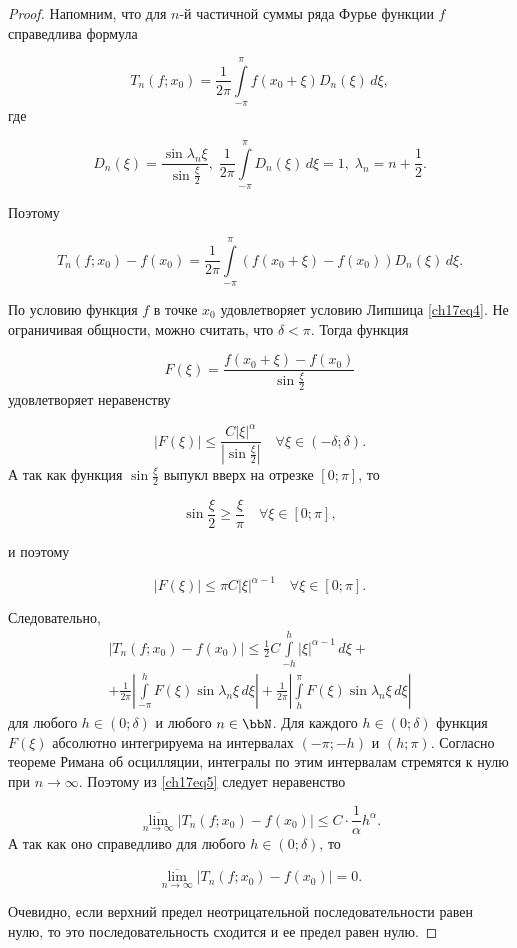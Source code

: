 \begin{proof}
Напомним, что для $n$-й частичной суммы ряда Фурье функции $f$ справедлива формула

$$
T_n(f;x_0) = \frac{1}{2\pi} \int\limits_{-\pi}^{\pi} f(x_0 + \xi) D_n(\xi) \,d\xi,
$$
где

$$
D_n(\xi) = \frac{\sin{\lambda_n \xi}}{\sin{\frac{\xi}{2}}}, \; \frac{1}{2\pi}\int\limits_{-\pi}^{\pi} D_n(\xi) \,d\xi = 1, \; \lambda_n = n + \frac12.
$$

Поэтому 

$$
T_n(f; x_0) - f(x_0) = \frac{1}{2\pi}\int\limits_{-\pi}^{\pi}(f(x_0 + \xi) - f(x_0))D_n(\xi)\,d\xi.
$$

По условию функция $f$ в точке $x_0$ удовлетворяет условию Липшица \eqref{ch17eq4}. Не ограничивая общности, можно считать, что $\delta < \pi$. Тогда функция 

$$
F(\xi) = \frac{f(x_0 + \xi) - f(x_0)}{\sin{\frac{\xi}{2}}}
$$
удовлетворяет неравенству

$$
|F(\xi)| \le \frac{C|\xi|^\alpha}{\left| \sin{\frac{\xi}{2}} \right|} \quad \forall \xi \in (-\delta; \delta).
$$
А так как функция $\sin{\frac{\xi}{2}}$ выпукл вверх на отрезке $[0; \pi]$, то

$$
\sin{\frac{\xi}{2}} \ge \frac{\xi}{\pi} \quad \forall \xi \in [0; \pi],
$$

и поэтому 

$$
|F(\xi)| \le \pi C |\xi|^{\alpha - 1} \quad \forall \xi \in [0; \pi].
$$

Следовательно,
\begin{multline} \label{ch17eq5}
|T_n(f; x_0) - f(x_0)| \le \frac{1}{2} C \int\limits_{-h}^{h} |\xi|^{\alpha - 1}\,d\xi + \\
+ \frac{1}{2\pi} \left| \int\limits_{-\pi}^{h} F(\xi) \sin{\lambda_n \xi} \,d\xi \right| + \frac{1}{2\pi} \left| \int\limits_{h}^{\pi} F(\xi) \sin{\lambda_n \xi} \,d\xi \right|
\end{multline}
для любого $h \in (0; \delta)$ и любого $n \in \bbN$. Для каждого $h \in (0;\delta)$ функция $F(\xi)$ абсолютно интегрируема на интервалах $(-\pi; -h)$ и $(h; \pi)$. Согласно теореме Римана об осцилляции, интегралы по этим интервалам стремятся к нулю при $n \to \infty$. Поэтому из \eqref{ch17eq5} следует неравенство

$$
\overline{\lim\limits_{n \to \infty}}|T_n(f; x_0) - f(x_0)| \le C \cdot \frac{1}{\alpha}h^{\alpha}.
$$
А так как оно справедливо для любого $h \in (0; \delta)$, то 

$$
\overline{\lim\limits_{n \to \infty}}|T_n(f; x_0) - f(x_0)| = 0.
$$

Очевидно, если верхний предел неотрицательной последовательности равен нулю, то это последовательность сходится и ее предел равен нулю.
\end{proof}

